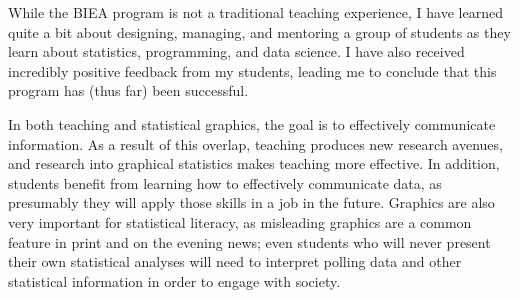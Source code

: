 \documentclass[12pt, letterpaper, sans]{moderncv}
\begin{document}
While the BIEA program is not a traditional teaching experience, I have learned quite a bit about designing, managing, and mentoring a group of students as they learn about statistics, programming, and data science. I have also received incredibly positive feedback from my students, leading me to conclude that this program has (thus far) been successful. 

\vspace{.5cm}\hspace{8pt} In both teaching and statistical graphics, the goal is to effectively communicate information. As a result of this overlap, teaching produces new research avenues, and research into graphical statistics makes teaching more effective. In addition, students benefit from learning how to effectively communicate data, as presumably they will apply those skills in a job in the future. Graphics are also very important for statistical literacy, as misleading graphics are a common feature in print and on the evening news; even students who will never present their own statistical analyses will need to interpret polling data and other statistical information in order to engage with society. 
\end{document}

